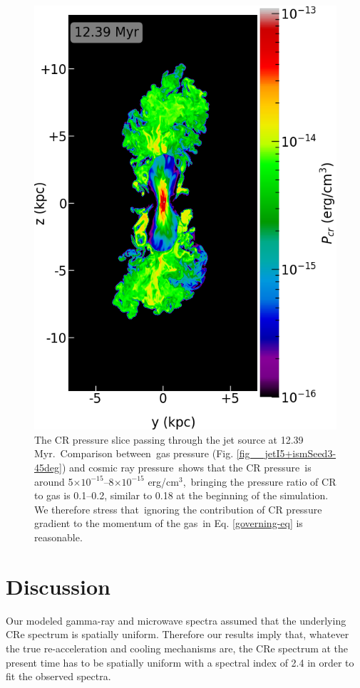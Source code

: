 \documentclass[fleqn,usenatbib,useAMS]{mnras}
\begin{document}
  \begin{figure}
    \includegraphics[width=\columnwidth]{figures/fig__jetI5+ismSeed3-45deg-CR.png}
    \caption{
     The CR pressure slice passing through the jet source at 12.39 Myr.\
     Comparison between\
     gas pressure (Fig. \ref{fig__jetI5+ismSeed3-45deg}) and cosmic ray pressure\
     shows that
     the CR pressure\
     is around 5$\times10^{-15}$--8$\times10^{-15}$ erg/cm$^{3}$,\
     bringing the pressure ratio of CR to gas is 0.1--0.2,
     similar to 0.18 at the beginning of the simulation.
     We therefore stress that\
     ignoring the contribution of CR pressure gradient to the momentum of the gas\
     in Eq. \ref{governing-eq} is reasonable.
     }
    \label{fig__jetI5+ismSeed3-45deg-CR}
  \end{figure}

\section{Discussion}
Our modeled gamma-ray and microwave spectra assumed that
the underlying CRe spectrum is spatially uniform.
Therefore our results imply that, whatever the true re-acceleration and cooling mechanisms are,
the CRe spectrum at the present time has to be spatially uniform with
a spectral index of 2.4 in order to fit the observed spectra.
\end{document}
